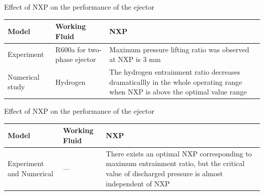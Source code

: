 \begin{frame}{Effect of NXP on the performance of the ejector\cite{tashtoush2019comprehensive}}
    \begin{table}[h]
        \centering
        \begin{tabular}{|p{2cm}|p{1.5cm}|p{5cm}|}
        \hline
            Model & Working Fluid & NXP\\
        \hline
             Experiment\cite{jeon2017performance} & R600a for two-phase ejector & Maximum pressure lifting ratio was observed at NXP is 3 mm  \\
        \hline
             Numerical study\cite{pei2019numerical} & Hydrogen & The hydrogen entrainment ratio decreases dramaticallly in the whole operating range when NXP is above the optimal value range\\
        \hline
        \end{tabular}
    \end{table}
\end{frame}

\begin{frame}{Effect of NXP on the performance of the ejector\cite{tashtoush2019comprehensive}}
    \begin{table}[h]
        \centering
        \begin{tabular}{|p{2cm}|p{1.5cm}|p{5cm}|}
        \hline
            Model & Working Fluid & NXP\\
        \hline
             Experiment and Numerical\cite{chong2014experimental} & --- & There exists an optimal NXP corresponding to maximum entrainment ratio, but the critical value of discharged pressure is almost independent of NXP  \\
        \hline
        \end{tabular}
    \end{table}
\end{frame}

